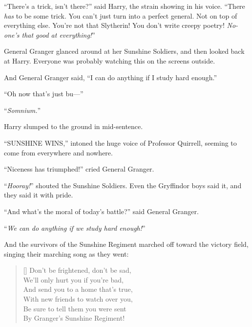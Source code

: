 “There’s a trick, isn’t there?” said Harry, the strain showing in his voice. “There \emph{has} to be some trick. You can’t just turn into a perfect general. Not on top of everything else. You’re not that Slytherin! You don’t write creepy poetry! \emph{No-one’s that good at everything!}”

General Granger glanced around at her Sunshine Soldiers, and then looked back at Harry. Everyone was probably watching this on the screens outside.

And General Granger said, “I can do anything if I study hard enough.”

“Oh now that’s just bu—”

“\emph{Somnium.}”

Harry slumped to the ground in mid-sentence.

“SUNSHINE WINS,” intoned the huge voice of Professor Quirrell, seeming to come from everywhere and nowhere.

“Niceness has triumphed!” cried General Granger.

“\emph{Hooray!}” shouted the Sunshine Soldiers. Even the Gryffindor boys said it, and they said it with pride.

“And what’s the moral of today’s battle?” said General Granger.

“\emph{We can do anything if we study hard enough!}”

And the survivors of the Sunshine Regiment marched off toward the victory field, singing their marching song as they went:

\begin{verse}[\versewidth]
Don’t be frightened, don’t be sad,\\
We’ll only hurt you if you’re bad,\\
And send you to a home that’s true,\\
With new friends to watch over you,\\
Be sure to tell them you were sent\\
By Granger’s Sunshine Regiment!
\end{verse}

